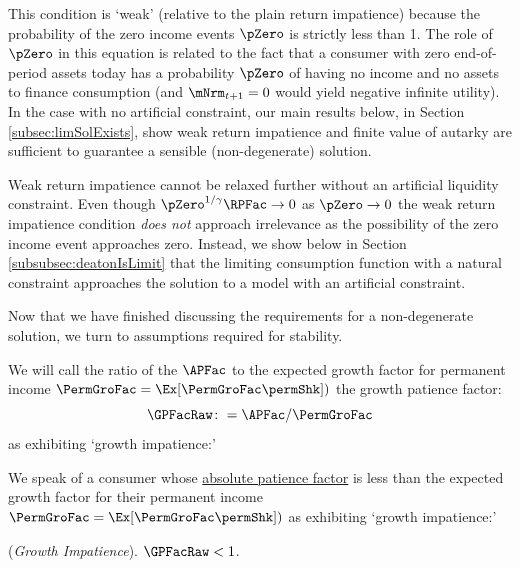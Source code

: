 \documentclass[BufferStockTheory]{subfiles}
\begin{document}
This condition is `weak' (relative to the plain return impatience) because the probability of the zero income events $\pZero$ is strictly less than 1.
The role of $\pZero$ in this equation is related to the fact that a consumer with zero end-of-period assets today has a probability $\pZero$ of having no income and no assets to finance consumption (and $\mNrm_{t+1}=0$ would yield negative infinite utility).
In the case with no artificial constraint, our main results below, in Section \ref{subsec:limSolExists},  show weak return impatience and finite value of autarky are sufficient to guarantee a sensible (non-degenerate) solution.

Weak return impatience cannot be relaxed further without an artificial liquidity constraint.
Even though $\pZero^{1/\CRRA} \RPFac\rightarrow 0$ as $\pZero\rightarrow 0$ the weak return impatience condition \textit{does not} approach irrelevance as the possibility of the zero income event approaches zero.
Instead, we show below in Section \ref{subsubsec:deatonIsLimit} that the limiting consumption function with a natural constraint approaches the solution to a model with an artificial constraint.
% 

Now that we have finished discussing the requirements for a non-degenerate solution, we turn to assumptions required for stability.

\hypertarget{GPFacRawDefn}{}
\newcommand{\GPFacRawName}{growth patience factor}
We will call the ratio of the $\APFac$ to the expected growth factor for permanent income $\PermGroFac = \Ex[\PermGroFac \permShk])$
the \GPFacRawName:
\begin{equation}\label{eq:GPFacRaw}
    \GPFacRaw \colon= \APFac/\PermGroFac
\end{equation}
as exhibiting `growth impatience:' 

We speak of a consumer whose \hyperlink{APFac}{absolute patience factor} is less than the expected growth factor for their permanent income $\PermGroFac = \Ex[\PermGroFac \permShk])$ as exhibiting `growth impatience:' 
\hypertarget{GICRaw}{}
\begin{assumS}\label{ass:GICRaw} (\textit{Growth Impatience}).
$ \GPFacRaw  < 1$.
\end{assumS}

\end{document}
